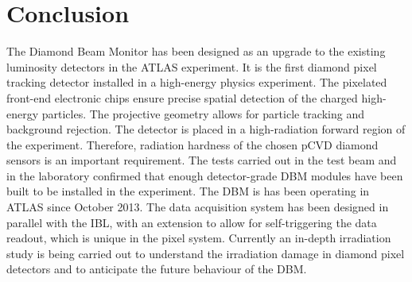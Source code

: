 \section{Conclusion}
\label{sec:limitations}
The Diamond Beam Monitor has been designed as an upgrade to the existing luminosity detectors in the ATLAS experiment. It is the first diamond pixel tracking detector installed in a high-energy physics experiment. The pixelated front-end electronic chips ensure precise spatial detection of the charged high-energy particles. The projective geometry allows for particle tracking and background rejection. The detector is placed in a high-radiation forward region of the experiment. Therefore, radiation hardness of the chosen pCVD diamond sensors is an important requirement. The tests carried out in the test beam and in the laboratory confirmed that enough detector-grade DBM modules have been built to be installed in the experiment. The DBM is has been operating in ATLAS since October 2013. The data acquisition system has been designed in parallel with the IBL, with an extension to allow for self-triggering the data readout, which is unique in the pixel system. Currently an in-depth irradiation study is being carried out to understand the irradiation damage in diamond pixel detectors and to anticipate the future behaviour of the DBM.

